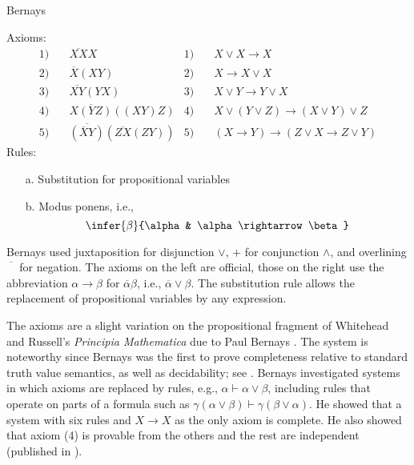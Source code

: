 \begin{entry}{Bernays}  

\begin{calculus}
Axioms:
\begin{align*}
1)\quad & \overline{XX}X &
1)\quad & X \lor X \rightarrow X\\
2) \quad & \overline{X}(XY) &
2) \quad & X \rightarrow X \lor X\\
3) \quad & \overline{XY}(YX) &
3) \quad & X \lor Y \rightarrow Y \lor X \\
4) \quad & \overline{X(YZ)}((XY)Z) &
4) \quad & X \lor (Y \lor Z) \rightarrow (X \lor Y) \lor Z \\
5) \quad & \overline{(\overline{X}Y)}(\overline{ZX}(ZY)) &
5) \quad & (X \rightarrow Y) \rightarrow (Z \lor X \rightarrow Z \lor Y) 
\end{align*}
Rules:
\begin{enumerate}
\item[a.] Substitution for propositional variables
\item[b.] Modus ponens, i.e.,
\[
\infer{\beta}{\alpha & \alpha \rightarrow \beta}
\]
\end{enumerate}

\end{calculus}

\begin{clarifications}
Bernays used juxtaposition for disjunction $\lor$, $+$ for conjunction
$\land$, and overlining $\overline{\phantom{X}}$ for
negation. The axioms on the left are official, those on the right use the abbreviation $\alpha \rightarrow \beta$ for
$\overline{\alpha}\beta$, i.e., $\overline{\alpha} \lor \beta$. The substitution
rule allows the replacement of propositional variables by any
expression.
\end{clarifications}

\begin{history}
The axioms are a slight variation on the propositional fragment of
Whitehead and Russell's \emph{Principia
Mathematica}  due to Paul
Bernays \cite{Bernays1918}.  The system is noteworthy since Bernays
was the first to prove completeness relative to standard truth value
semantics, as well as decidability; see \cite{Zach1999}. Bernays investigated systems in which axioms are replaced
by rules, e.g., $\alpha \vdash \alpha \lor \beta$, including rules
that operate on parts of a formula such as
$\gamma(\alpha \lor \beta) \vdash \gamma(\beta \lor \alpha)$. He showed
that a system with six rules and $X \rightarrow X$ as the only axiom
is complete. He also
showed that axiom (4) is provable from the others and the rest are
independent (published in \cite{Bernays1926}). 
\end{history}


\end{entry}
